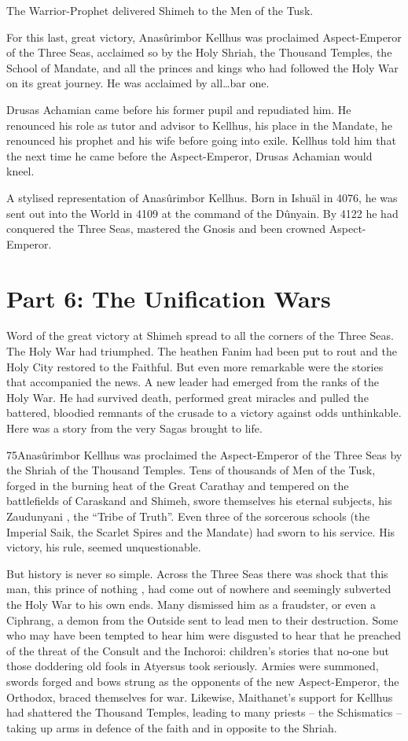 \documentclass[]{book}
\begin{document}
The Warrior-Prophet delivered Shimeh to the Men of the Tusk.

For this last, great victory, Anasûrimbor Kellhus was proclaimed Aspect-Emperor of the
Three Seas, acclaimed so by the Holy Shriah, the Thousand Temples, the School of
Mandate, and all the princes and kings who had followed the Holy War on its great
journey. He was acclaimed by all\ldots{}bar one.

Drusas Achamian came before his former pupil and repudiated him. He renounced his
role as tutor and advisor to Kellhus, his place in the Mandate, he renounced his
prophet and his wife before going into exile. Kellhus told him that the next time he
came before the Aspect-Emperor, Drusas Achamian would kneel.

A stylised representation of Anasûrimbor Kellhus. Born in Ishuäl in 4076, he was sent out into the World in 4109 at the command of the Dûnyain. By 4122 he had conquered the Three Seas, mastered the Gnosis and been crowned Aspect-Emperor.

\hypertarget{part-6-the-unification-wars}{%
\chapter{Part 6: The Unification Wars}\label{part-6-the-unification-wars}}

Word of the great victory at Shimeh spread to all the corners of the Three Seas. The
Holy War had triumphed. The heathen Fanim had been put to rout and the Holy City
restored to the Faithful. But even more remarkable were the stories that accompanied
the news. A new leader had emerged from the ranks of the Holy War. He had survived
death, performed great miracles and pulled the battered, bloodied remnants of the
crusade to a victory against odds unthinkable. Here was a story from the very Sagas
brought to life.

75Anasûrimbor Kellhus was proclaimed the Aspect-Emperor of the Three Seas by the
Shriah of the Thousand Temples. Tens of thousands of Men of the Tusk, forged in the
burning heat of the Great Carathay and tempered on the battlefields of Caraskand and
Shimeh, swore themselves his eternal subjects, his Zaudunyani , the ``Tribe of Truth''.
Even three of the sorcerous schools (the Imperial Saik, the Scarlet Spires and the
Mandate) had sworn to his service. His victory, his rule, seemed unquestionable.

But history is never so simple. Across the Three Seas there was shock that this man, this
prince of nothing , had come out of nowhere and seemingly subverted the Holy War to
his own ends. Many dismissed him as a fraudster, or even a Ciphrang, a demon from
the Outside sent to lead men to their destruction. Some who may have been tempted to
hear him were disgusted to hear that he preached of the threat of the Consult and the
Inchoroi: children's stories that no-one but those doddering old fools in Atyersus took
seriously. Armies were summoned, swords forged and bows strung as the opponents of
the new Aspect-Emperor, the Orthodox, braced themselves for war. Likewise,
Maithanet's support for Kellhus had shattered the Thousand Temples, leading to many
priests -- the Schismatics -- taking up arms in defence of the faith and in opposite to the
Shriah.
\end{document}
